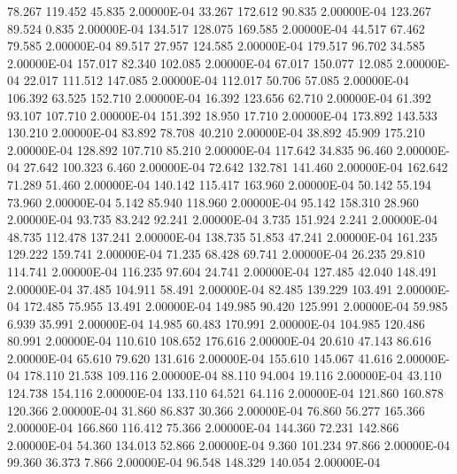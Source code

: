     78.267   119.452    45.835  2.00000E-04
    33.267   172.612    90.835  2.00000E-04
   123.267    89.524     0.835  2.00000E-04
   134.517   128.075   169.585  2.00000E-04
    44.517    67.462    79.585  2.00000E-04
    89.517    27.957   124.585  2.00000E-04
   179.517    96.702    34.585  2.00000E-04
   157.017    82.340   102.085  2.00000E-04
    67.017   150.077    12.085  2.00000E-04
    22.017   111.512   147.085  2.00000E-04
   112.017    50.706    57.085  2.00000E-04
   106.392    63.525   152.710  2.00000E-04
    16.392   123.656    62.710  2.00000E-04
    61.392    93.107   107.710  2.00000E-04
   151.392    18.950    17.710  2.00000E-04
   173.892   143.533   130.210  2.00000E-04
    83.892    78.708    40.210  2.00000E-04
    38.892    45.909   175.210  2.00000E-04
   128.892   107.710    85.210  2.00000E-04
   117.642    34.835    96.460  2.00000E-04
    27.642   100.323     6.460  2.00000E-04
    72.642   132.781   141.460  2.00000E-04
   162.642    71.289    51.460  2.00000E-04
   140.142   115.417   163.960  2.00000E-04
    50.142    55.194    73.960  2.00000E-04
     5.142    85.940   118.960  2.00000E-04
    95.142   158.310    28.960  2.00000E-04
    93.735    83.242    92.241  2.00000E-04
     3.735   151.924     2.241  2.00000E-04
    48.735   112.478   137.241  2.00000E-04
   138.735    51.853    47.241  2.00000E-04
   161.235   129.222   159.741  2.00000E-04
    71.235    68.428    69.741  2.00000E-04
    26.235    29.810   114.741  2.00000E-04
   116.235    97.604    24.741  2.00000E-04
   127.485    42.040   148.491  2.00000E-04
    37.485   104.911    58.491  2.00000E-04
    82.485   139.229   103.491  2.00000E-04
   172.485    75.955    13.491  2.00000E-04
   149.985    90.420   125.991  2.00000E-04
    59.985     6.939    35.991  2.00000E-04
    14.985    60.483   170.991  2.00000E-04
   104.985   120.486    80.991  2.00000E-04
   110.610   108.652   176.616  2.00000E-04
    20.610    47.143    86.616  2.00000E-04
    65.610    79.620   131.616  2.00000E-04
   155.610   145.067    41.616  2.00000E-04
   178.110    21.538   109.116  2.00000E-04
    88.110    94.004    19.116  2.00000E-04
    43.110   124.738   154.116  2.00000E-04
   133.110    64.521    64.116  2.00000E-04
   121.860   160.878   120.366  2.00000E-04
    31.860    86.837    30.366  2.00000E-04
    76.860    56.277   165.366  2.00000E-04
   166.860   116.412    75.366  2.00000E-04
   144.360    72.231   142.866  2.00000E-04
    54.360   134.013    52.866  2.00000E-04
     9.360   101.234    97.866  2.00000E-04
    99.360    36.373     7.866  2.00000E-04
    96.548   148.329   140.054  2.00000E-04
